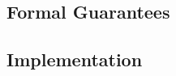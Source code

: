 \subsection{Formal Guarantees}\label{sex:formal:guarantees}

\subsection{Implementation}\label{subsec:jsil:analysis:implementation}

%

%
%
%

% 
% 

% 
%
%

